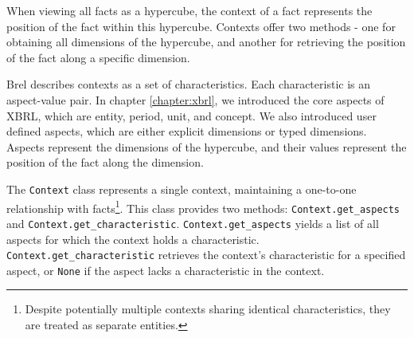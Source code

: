 When viewing all facts as a hypercube, the context of a fact represents the position of the fact within this hypercube.
Contexts offer two methods - 
one for obtaining all dimensions of the hypercube, and another for retrieving the position of the fact along a specific dimension.

Brel describes contexts as a set of characteristics.
Each characteristic is an aspect-value pair.
In chapter \ref{chapter:xbrl}, we introduced the core aspects of XBRL, which are entity, period, unit, and concept.
We also introduced user defined aspects, which are either explicit dimensions or typed dimensions.
Aspects represent the dimensions of the hypercube, and their values represent the position of the fact along the dimension.

The \texttt{Context} class represents a single context,
maintaining a one-to-one relationship with facts\footnote{Despite potentially multiple contexts sharing identical characteristics, they are treated as separate entities.}.
This class provides two methods: \texttt{Context.get\_aspects} and \texttt{Context.get\_characteristic}.
\texttt{Context.get\_aspects} yields a list of all aspects for which the context holds a characteristic.
\texttt{Context.get\_characteristic} retrieves the context's characteristic for a specified aspect, or \texttt{None} if the aspect lacks a characteristic in the context.


